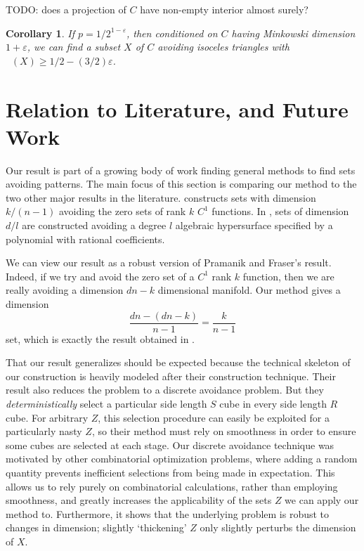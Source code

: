 \documentclass[dvipsnames,letterpaper,12pt]{article}
\numberwithin{equation}{section}
\theoremstyle{plain}
\newtheorem{corollary}{Corollary}
\DeclareMathOperator{\hausdim}{\dim_{\mathbf{H}}}
\begin{document}
TODO: does a projection of $C$ have non-empty interior almost surely?

\begin{corollary}
	If $p = 1/2^{1 - \varepsilon}$, then conditioned on $C$ having Minkowski dimension $1 + \varepsilon$, we can find a subset $X$ of $C$ avoiding isoceles triangles with $\hausdim(X) \geq 1/2 - (3/2) \varepsilon$.
\end{corollary}










\section{Relation to Literature, and Future Work}\label{futureWorkSection}

Our result is part of a growing body of work finding general methods to find sets avoiding patterns. The main focus of this section is comparing our method to the two other major results in the literature. \cite{MalabikaRob} constructs sets with dimension $k/(n-1)$ avoiding the zero sets of rank $k$ $C^1$ functions. In \cite{Mathe}, sets of dimension $d/l$ are constructed avoiding a degree $l$ algebraic hypersurface specified by a polynomial with rational coefficients.

We can view our result as a robust version of Pramanik and Fraser's result. Indeed, if we try and avoid the zero set of a $C^1$ rank $k$ function, then we are really avoiding a dimension $dn - k$ dimensional manifold. Our method gives a dimension
%
\[ \frac{dn - (dn - k)}{n - 1} = \frac{k}{n - 1} \]
%
set, which is exactly the result obtained in \cite{MalabikaRob}.

That our result generalizes \cite{MalabikaRob} should be expected because the technical skeleton of our construction is heavily modeled after their construction technique. Their result also reduces the problem to a discrete avoidance problem. But they {\it deterministically} select a particular side length $S$ cube in every side length $R$ cube. For arbitrary $Z$, this selection procedure can easily be exploited for a particularly nasty $Z$, so their method must rely on smoothness in order to ensure some cubes are selected at each stage. Our discrete avoidance technique was motivated by other combinatorial optimization problems, where adding a random quantity prevents inefficient selections from being made in expectation. This allows us to rely purely on combinatorial calculations, rather than employing smoothness, and greatly increases the applicability of the sets $Z$ we can apply our method to. Furthermore, it shows that the underlying problem is robust to changes in dimension; slightly `thickening' $Z$ only slightly perturbs the dimension of $X$.
\end{document}
